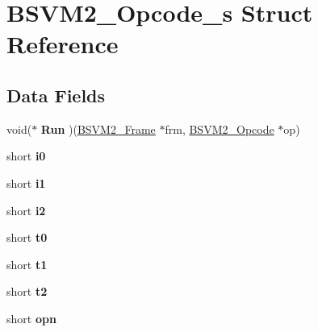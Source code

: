 \hypertarget{structBSVM2__Opcode__s}{\section{B\-S\-V\-M2\-\_\-\-Opcode\-\_\-s Struct Reference}
\label{structBSVM2__Opcode__s}
}
\subsection*{Data Fields}
\begin{DoxyCompactItemize}
\item 
\hypertarget{structBSVM2__Opcode__s_aabab053ac361354e5b03b9794cfa216b}{void($\ast$ {\bfseries Run} )(\hyperlink{structBSVM2__Frame__s}{B\-S\-V\-M2\-\_\-\-Frame} $\ast$frm, \hyperlink{structBSVM2__Opcode__s}{B\-S\-V\-M2\-\_\-\-Opcode} $\ast$op)}\label{structBSVM2__Opcode__s_aabab053ac361354e5b03b9794cfa216b}

\item 
\hypertarget{structBSVM2__Opcode__s_a8ecc044eb079c43dd9d11cc1a7b6b326}{short {\bfseries i0}}\label{structBSVM2__Opcode__s_a8ecc044eb079c43dd9d11cc1a7b6b326}

\item 
\hypertarget{structBSVM2__Opcode__s_a9c84c17e13143d0df0128560398e740c}{short {\bfseries i1}}\label{structBSVM2__Opcode__s_a9c84c17e13143d0df0128560398e740c}

\item 
\hypertarget{structBSVM2__Opcode__s_ad4b8bf0b86f187ca5d015bf098ca1b3b}{short {\bfseries i2}}\label{structBSVM2__Opcode__s_ad4b8bf0b86f187ca5d015bf098ca1b3b}

\item 
\hypertarget{structBSVM2__Opcode__s_a5bfa77ca4ae775abbfd41c0f33526bee}{short {\bfseries t0}}\label{structBSVM2__Opcode__s_a5bfa77ca4ae775abbfd41c0f33526bee}

\item 
\hypertarget{structBSVM2__Opcode__s_a9590b19243e8cc7e9714cc6ddc8c307d}{short {\bfseries t1}}\label{structBSVM2__Opcode__s_a9590b19243e8cc7e9714cc6ddc8c307d}

\item 
\hypertarget{structBSVM2__Opcode__s_ac6b67529f96a62746dd786c6d985c1a1}{short {\bfseries t2}}\label{structBSVM2__Opcode__s_ac6b67529f96a62746dd786c6d985c1a1}

\item 
\hypertarget{structBSVM2__Opcode__s_a36898d34482892c1ee7fbe1214eb0eb6}{short {\bfseries opn}}\label{structBSVM2__Opcode__s_a36898d34482892c1ee7fbe1214eb0eb6}


\end{DoxyCompactItemize}
